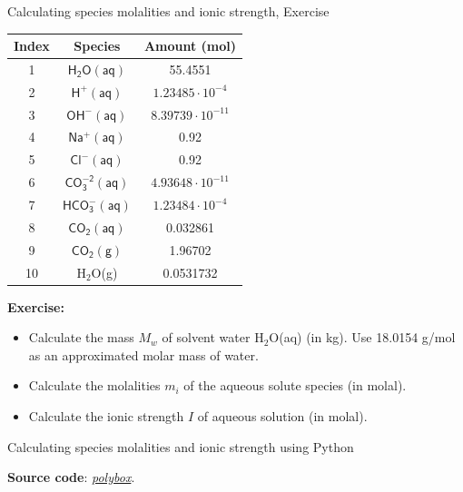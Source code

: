 %
\begin{frame}{Calculating species molalities and ionic strength,  Exercise}

\lcol
\begin{center}
\begin{tabular}{ccc}
\toprule 
\textbf{Index} & \textbf{Species} & \textbf{Amount (mol)}\tabularnewline
\midrule
1 & \textrm{$\mathsf{H_{2}O(aq)}$} & 55.4551\tabularnewline
2 & \textrm{$\mathsf{H^{+}(aq)}$} & $1.23485\cdot10^{-4}$\tabularnewline
3 & \textrm{$\mathsf{OH^{-}(aq)}$} & $8.39739\cdot10^{-11}$\tabularnewline
4 & \textrm{$\mathsf{Na^{+}(aq)}$} & 0.92\tabularnewline
5 & \textrm{$\mathsf{Cl^{-}(aq)}$} & 0.92\tabularnewline
6 & \textrm{$\mathsf{CO_{3}^{-2}(aq)}$} & $4.93648\cdot10^{-11}$\tabularnewline
7 & \textrm{$\mathsf{HCO_{3}^{-}(aq)}$} & $1.23484\cdot10^{-4}$\tabularnewline
8 & \textrm{$\mathsf{CO_{2}(aq)}$} & 0.032861\tabularnewline
9 & \textrm{$\mathsf{CO_{2}(g)}$} & 1.96702\tabularnewline
10 & H$_{2}$O(g) & 0.0531732\tabularnewline
\bottomrule
\end{tabular}
\par\end{center}

\rcol

\textbf{Exercise:}
\begin{itemize}
\item Calculate the mass $M_{w}$ of solvent water H$_{2}$O(aq) (in kg).
Use 18.0154 g/mol as an approximated molar mass of water.
\item Calculate the molalities $m_{i}$ of the aqueous solute species (in
molal).
\item Calculate the ionic strength $I$ of aqueous solution (in molal).
\end{itemize}

\ecol
\end{frame}
%
%
\begin{frame}{Calculating species molalities and ionic strength using Python}



\textbf{Source code}: \href{https://polybox.ethz.ch/index.php/s/xmvAZqB9bcGvEz3}{\textcolor{indigo(dye)}{\it polybox}}.

\end{frame}
